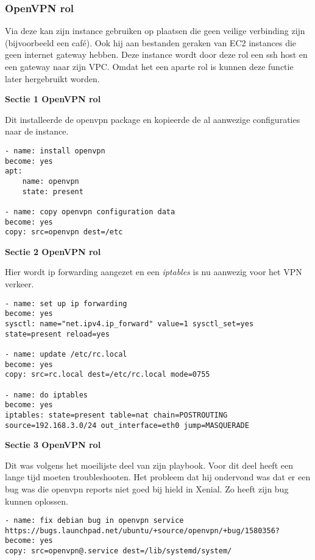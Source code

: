 \newpage
\subsubsection{OpenVPN rol}

Via deze kan \autocite{scottharney} zijn instance gebruiken op plaatsen die geen veilige verbinding zijn (bijvoorbeeld een café). Ook hij aan bestanden geraken van EC2 instances die geen internet gateway hebben. Deze instance wordt door deze rol een ssh host en een gateway naar \autocite{scottharney} zijn VPC. Omdat het een aparte rol is kunnen deze functie later hergebruikt worden.

\textbf{Sectie 1 OpenVPN rol}

Dit installeerde de openvpn package en kopieerde de al aanwezige configuraties naar de instance.
\begin{lstlisting}
- name: install openvpn
become: yes
apt:
    name: openvpn
    state: present

- name: copy openvpn configuration data
become: yes
copy: src=openvpn dest=/etc
\end{lstlisting}

\textbf{Sectie 2 OpenVPN rol}

Hier wordt ip forwarding aangezet en een \textit{iptables} is nu aanwezig voor het VPN verkeer.
\begin{lstlisting}
- name: set up ip forwarding
become: yes
sysctl: name="net.ipv4.ip_forward" value=1 sysctl_set=yes state=present reload=yes

- name: update /etc/rc.local
become: yes
copy: src=rc.local dest=/etc/rc.local mode=0755

- name: do iptables
become: yes
iptables: state=present table=nat chain=POSTROUTING source=192.168.3.0/24 out_interface=eth0 jump=MASQUERADE
\end{lstlisting}

\textbf{Sectie 3 OpenVPN rol}

Dit was volgens \autocite{scottharney} het moeilijste deel van zijn playbook. Voor dit deel heeft een lange tijd moeten troubleshooten. Het probleem dat hij ondervond was dat er een bug was die openvpn reports niet goed bij hield in Xenial. Zo heeft \autocite{scottharney} zijn bug kunnen oplossen.
\begin{lstlisting}
- name: fix debian bug in openvpn service https://bugs.launchpad.net/ubuntu/+source/openvpn/+bug/1580356?
become: yes
copy: src=openvpn@.service dest=/lib/systemd/system/
\end{lstlisting}

